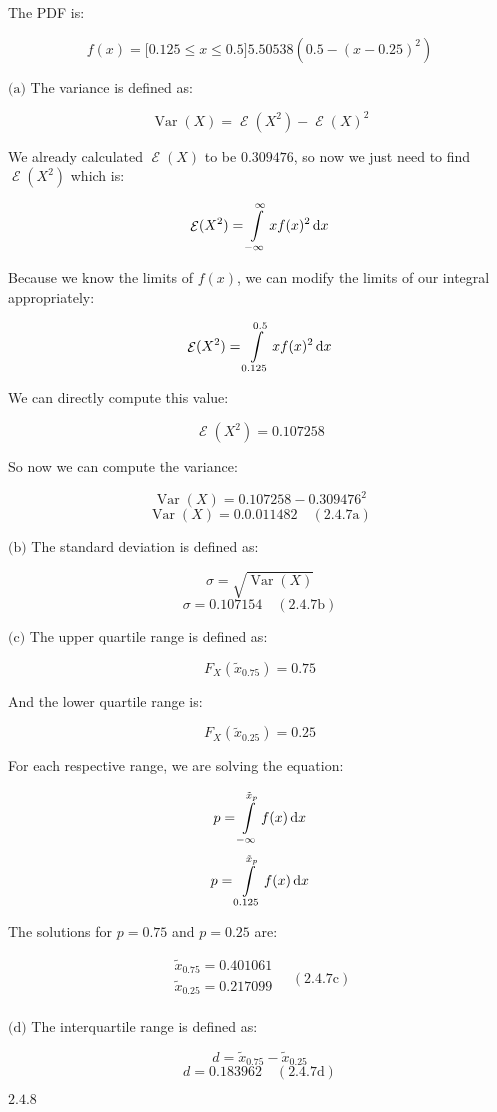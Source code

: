 \documentclass{article}
\newcommand{\problem}[2]{$\boxed{\text{#1.#2}}$}
\newcommand{\subproblem}[3]{$\boxed{\text{(#3)}}$}
\newcommand{\subsolution}[4]{\boxed{#4\quad(\text{#1.#2#3})}}
\renewcommand{\d}[1]{\,\textnormal{d}#1}
\DeclareMathOperator{\var}{Var}
\DeclareMathOperator{\E}{\mathcal{E}}
\begin{document}
The PDF is:

\[
f(x)=\lbrack0.125\le x\le 0.5\rbrack 5.50538(0.5-(x-0.25)^2)
\]

%
\subproblem{2.4}{7}{a} The variance is defined as:

\[
\var(X) = \E(X^2)-\E(X)^2
\]

We already calculated $\E(X)$ to be $0.309476$, so now we just need to
find $\E(X^2)$ which is:

\[
\E(X^2)=\int\limits_{-\infty}^\infty x f(x)^2\d{x}
\]

Because we know the limits of $f(x)$, we can modify the limits of our
integral appropriately:

\[
\E(X^2)=\int\limits_{0.125}^{0.5} x f(x)^2\d{x}
\]

We can directly compute this value:

\[
\E(X^2)=0.107258
\]

So now we can compute the variance:

\[
\var(X)=0.107258 - 0.309476^2
\] \[
\subsolution{2.4}{7}{a}{\var(X)=0.0.011482}
\]

%
\subproblem{2.4}{7}{b} The standard deviation is defined as:

\[
\sigma = \sqrt{\var(X)}
\] \[
\subsolution{2.4}{7}{b}{\sigma = 0.107154}
\]

%
\subproblem{2.4}{7}{c} The upper quartile range is defined as:

\[
F_X(\tilde{x}_{0.75})=0.75
\]

And the lower quartile range is:

\[
F_X(\tilde{x}_{0.25})=0.25
\]

For each respective range, we are solving the equation:

\[
p=\int\limits_{-\infty}^{\tilde{x}_p} f(x)\d{x}
\] \[
p=\int\limits_{0.125}^{\tilde{x}_p} f(x)\d{x}
\]

The solutions for $p=0.75$ and $p=0.25$ are:

\[
\subsolution{2.4}{7}{c}{\begin{array}{l}
\tilde{x}_{0.75}=0.401061 \\
\tilde{x}_{0.25}=0.217099 \\
\end{array}}
\]

%
\subproblem{2.4}{7}{d} The interquartile range is defined as:

\[
d=\tilde{x}_{0.75}-\tilde{x}_{0.25}
\] \[
\subsolution{2.4}{7}{d}{d=0.183962}
\]

%
\problem{2.4}{8}
\end{document}
